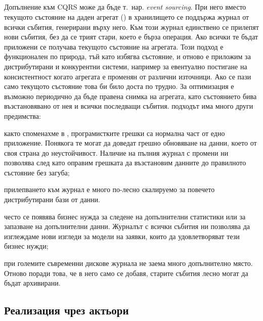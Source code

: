 \subsection{}

Допълнение към CQRS може да бъде т.~нар. \emph{event sourcing}. При него вместо текущото състояние на даден агрегат (\cite{evans2003DDD}) в хранилището се поддържа журнал от всички събития, генерирани върху него. Към този журнал единствено се прилепят нови събития, без да се трият стари, което е бърза операция. Ако всички те бъдат приложени се получава текущото състояние на агрегата. Този подход е функционален по природа, тъй като избягва състояние, и отново е приложим за дистрибутирани и конкурентни системи, например за евентуално постигане на консистентност когато агрегата е променян от различни източници. Ако се пази само текущото състояние това би било доста по трудно. За оптимизация е възможно периодично да бъде правена снимка на агрегата, като състоянието бива възстановявано от нея и всички последващи събития.  подходът има много други предимства:

\begin{itemize*}
  \item както споменахме в , програмистките грешки са нормална част от едно приложение. Понякога те могат да доведат грешно обновяване на данни, което от своя страна до неустойчивост. Наличие на пълния журнал с промени ни позволява след като оправим грешката да възстановим данните до правилното състояние без загуба;
  
  \item прилепването към журнал е много по-лесно скалируемо за повечето дистрибутирани бази от данни.
  
  \item често се появява бизнес нужда за следене на допълнителни статистики или за запазване на допълнителни данни. Журналът с всички събития ни позволява да изглеждаме нови изгледи за модели на заявки, които да удовлетворяват тези бизнес нужди;
  
  \item при големите съвременни дискове журнала не заема много допълнително място. Отново поради това, че в него само се добавя, старите събития лесно могат да бъдат архивирани.
\end{itemize*}

\subsection{Реализация чрез актьори}

